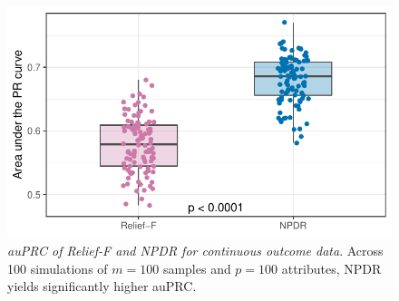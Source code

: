 \documentclass{article}
\begin{document}
\begin{figure}[h]%
\centerline{\includegraphics[]{../figs/pr_compare_qtrait.pdf}}
\caption{\emph{auPRC of Relief-F and NPDR for continuous outcome data}. Across 100 simulations of $m = 100$ samples and $p = 100$ attributes, NPDR yields significantly higher auPRC.}
\label{fig:auPRC_qtrait}
\end{figure}
\end{document}
